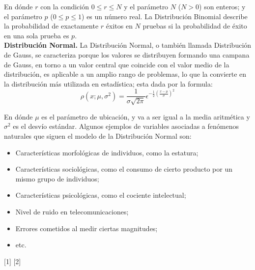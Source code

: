 \documentclass[12pt,a4paper]{article}
\begin{document}
\begin{multicols}{2}
    En dónde $r$ con la condición $0\leq r\leq N$ y el parámetro $N$ ($N>0$) son enteros; y el parámetro $p$ ($0\leq p\leq1$) es un número real. La Distribución Binomial describe la probabilidad de exactamente $r$ éxitos en $N$ pruebas si la probabilidad de éxito en una sola prueba es $p$. 
    \\ \textbf{Distribución Normal.} La Distribución Normal, o también llamada Distribución de Gauss, se caracteriza porque los valores  se distribuyen  formando una campana de Gauss, en torno  a un valor central que coincide con el valor  medio de la distribución, es aplicable a un amplio rango de problemas, lo que la convierte en la distribución más utilizada en estadística; esta dada por la formula:
    $$\rho(x;\mu,\sigma^2)=\frac{1}{\sigma\sqrt{2\pi}}\epsilon^{-\frac{1}{2}(\frac{x-\mu}{\sigma})^2}$$
    
    En dónde $\mu$ es el parámetro de ubicación, y va a ser igual a la media aritmética y $\sigma^2$ es el desvío estándar. Algunos ejemplos de variables asociadas a fenómenos naturales que siguen el modelo de la Distribución Normal son:
    \begin{itemize}
        \item Características morfológicas de individuos, como la estatura;
        \item Características sociológicas, como el consumo de cierto producto por un mismo grupo de individuos;
        \item Características psicológicas, como el cociente intelectual;
        \item Nivel de ruido en telecomunicaciones;
        \item Errores cometidos al medir ciertas magnitudes;
        \item etc.
    \end{itemize}
    
    
    [1] [2]
    
    
    
    

\end{multicols}
\end{document}
